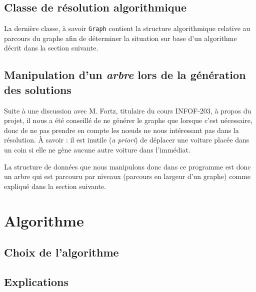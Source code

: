 \documentclass{article}
\begin{document}
    \subsection{Classe de résolution algorithmique}
        La dernière classe, à savoir \texttt{Graph} contient la structure algorithmique relative au parcours du graphe afin de déterminer la situation
        sur base d'un algorithme décrit dans la section suivante.

    \subsection{Manipulation d'un \textit{arbre} lors de la génération des solutions}
        Suite à une discussion avec M. Fortz, titulaire du cours INFOF-203, à propos du projet, il nous a été conseillé de ne générer le graphe
        que lorsque c'est nécessaire, donc de ne pas prendre en compte les nœuds ne nous intéressant pas dans la résolution. À savoir : il est
        inutile (\textit{a priori}) de déplacer une voiture placée dans un coin si elle ne gène aucune autre voiture dans l'immédiat.

        La structure de données que nous manipulons donc dans ce programme est donc un arbre qui est parcouru par niveaux (parcours en largeur d'un graphe)
        comme expliqué dans la section suivante.

\section{Algorithme}
    \subsection{Choix de l'algorithme}
    \subsection{Explications}
\end{document}
